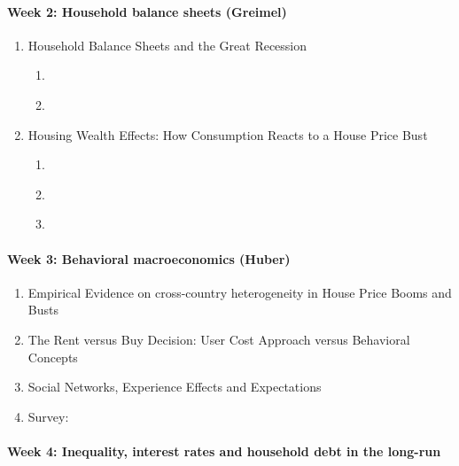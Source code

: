 \documentclass[a4paper,12pt]{article}
\begin{document}
\paragraph{Week 2: Household balance sheets (Greimel)}

\begin{enumerate}
\item Household Balance Sheets and the Great Recession
  \begin{enumerate}
  \item \cite{mian2013household}
  \item \cite{berger2015consumption}
  \end{enumerate}
\item Housing Wealth Effects: How Consumption Reacts to a House Price Bust
  \begin{enumerate}
  \item \cite{berger2018house}
  \item \cite{guren2021housing}
  \item \cite{greimel2019understanding}
  \end{enumerate}
\end{enumerate}

\paragraph{Week 3: Behavioral macroeconomics (Huber)}
\begin{enumerate}
\item Empirical Evidence on cross-country heterogeneity in House Price Booms and Busts \citep{Huber:2019}
\item The Rent versus Buy Decision: User Cost Approach
  versus Behavioral Concepts
  \citep{Huber:2022,Huber:2020}
\item Social Networks, Experience Effects and Expectations 
  \citep{Kuchler:2019, bailey2018housing, Malmendier:2019, kaplan2020housing}
\item Survey: \citep{kuchler2022expectations}
\end{enumerate}


\paragraph{Week 4: Inequality, interest rates and household debt in the long-run}
\end{document}
